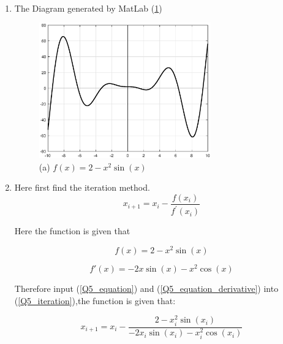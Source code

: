 \begin{solution}\ \\


\begin{enumerate}[label=(\alph*)]

\item
The Diagram generated by MatLab (\ref{Q5_a_1})\\
\begin{figure}[htb]
	\centering %
  	\includegraphics[width=0.7\textwidth]{fig/Q5_plot.eps}
  	\caption{(a) $f(x)=2-x^2 \sin(x)$} \label{Q5_a_1}
\end{figure}


\item Here first find the iteration method.\\

\begin{equation}
	x_{i+1}=x_{i}-\frac{f\left(x_{i}\right)}{f^{\prime}\left(x_{i}\right)} \label{Q5_iteration}
\end{equation}


Here the function is given that

\begin{equation}
	f(x)=2-x^2\sin (x) \label{Q5_equation}
\end{equation}

\begin{equation}
	f'(x)=-2x \sin(x) - x^2 \cos(x) \label{Q5_equation_derivative}
\end{equation}

Therefore input (\ref{Q5_equation}) and (\ref{Q5_equation_derivative}) into (\ref{Q5_iteration}),the function is given that:


\begin{equation}
	x_{i+1} =x_{i}-\frac{2-x_i^2\sin (x_i)}{-2x_i \sin(x_i) - x_i^2 \cos(x_i)} 
\end{equation}
	

\end{enumerate}
\end{solution}
